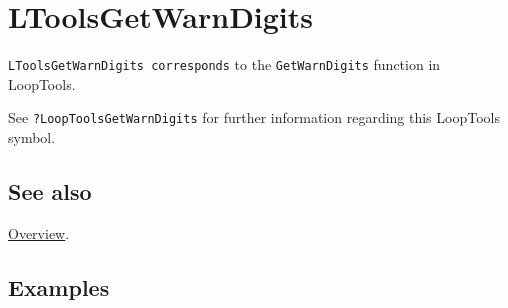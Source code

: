 \documentclass[../FeynHelpersManual.tex]{subfiles}
\begin{document}
\hypertarget{ltoolsgetwarndigits}{
\section{LToolsGetWarnDigits}\label{ltoolsgetwarndigits}}

\texttt{LToolsGetWarnDigits corresponds} to the \texttt{GetWarnDigits}
function in LoopTools.

See \texttt{?LoopTools\textasciigrave GetWarnDigits} for further
information regarding this LoopTools symbol.

\subsection{See also}

\hyperlink{toc}{Overview}.

\subsection{Examples}
\end{document}
